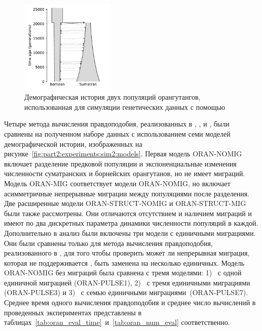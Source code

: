 \begin{figure}[ht]
    \centering
        \centering
        \includegraphics[width=0.4\textwidth]{images_experiments/suimulation_2_stdpopsim/ground_truth_history.pdf}
    \caption{Демографическая история двух популяций орангутангов, использованная для симуляции генетических данных с помощью \stdpopsim~\cite{adrion2020community}}
    \label{fig:part2:experiments:sim2:dem_hist}
\end{figure}

Четыре метода вычисления правдоподобия, реализованных в \dadi, \moments, \momi и \momentsLD, были сравнены на полученном наборе данных с использованием семи моделей демографической истории, изображенных на рисунке~\ref{fig:part2:experiments:sim2:models}.
Первая модель ORAN-NOMIG включает разделение предковой популяции и экспоненциальные изменения численности суматранских и борнейских орангутанов, но не имеет миграций.
Модель ORAN-MIG соответствует модели ORAN-NOMIG, но включает асимметричные непрерывные миграции между популяциями после разделения.
Две расширенные модели ORAN-STRUCT-NOMIG и ORAN-STRUCT-MIG были также рассмотрены.
Они отличаются отсутствием и наличием миграций и имеют по два дискретных параметра динамики численности популяций в каждой.
Дополнительно в анализ были включены три модели с единичными миграциями.
Они были сравнены только для метода вычисления правдоподобия, реализованного в \momi, для того чтобы проверить может ли непрерывная миграция, которая не поддерживается \momi, быть заменена на несколько единичных.
Модель ORAN-NOMIG без миграций была сравнена с тремя моделями: 1)~ с одной единичной миграцией (ORAN-PULSE1), 2)~ с тремя единичными миграциями (ORAN-PULSE3) и 3)~ с семью единичными миграциями~(ORAN-PULSE7).
Среднее время одного вычисления правдоподобия и среднее число вычислений в проведенных экспериментах представлены в таблицах~\ref{tab:oran_eval_time}~и~\ref{tab:oran_num_eval} соответственно.

